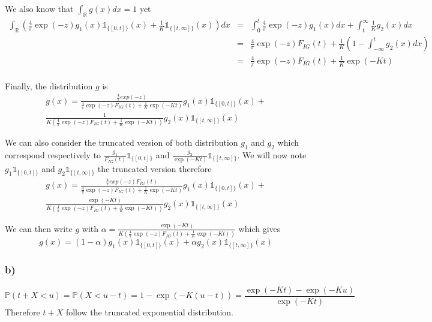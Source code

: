We also know that $\int_{\mathbb{R}} g(x)dx = 1$ yet
\begin{eqnarray*}
	\int_{\mathbb{R}}\left(\frac{4}{\pi}\exp(-z) g_1(x) \mathbb{1}_{\{[0,t]\}}(x)+ \frac{1}{K}\mathbb{1}_{\{[t,\infty]\}}(x)\right)dx &=& \int_{0}^t \frac{4}{\pi}\exp(-z) g_1(x)dx + \int_t^\infty \frac{1}{K}g_2(x)dx\\
	&=& \frac{4}{\pi} \exp(-z) F_{IG}(t) + \frac{1}{K} (1 - \int_{-\infty}^t g_2(x)dx)\\
	&=& \frac{4}{\pi} \exp(-z) F_{IG}(t) + \frac{1}{K} \exp(-Kt)\\
\end{eqnarray*}

Finally, the distribution $g$ is 
\begin{eqnarray*}
	g(x) = \frac{\frac{4}{\pi}exp(-z)}{\frac{4}{\pi} \exp(-z) F_{IG}(t) + \frac{1}{K} \exp(-Kt)}g_1(x) \mathbb{1}_{\{[0,t]\}}(x)+\\ \frac{1}{K(\frac{4}{\pi} \exp(-z) F_{IG}(t) + \frac{1}{K} \exp(-Kt))} g_2(x) \mathbb{1}_{\{[t,\infty]\}}(x)
\end{eqnarray*}


We can also consider the truncated version of both distribution $g_1$ and $g_2$ which correspond respectively to $\frac{g_1}{F_{IG}(t)}\mathbb{1}_{\{[0,t]\}}$ and $\frac{g_2}{\exp(-Kt)}\mathbb{1}_{\{[t,\infty]\}}$. We will now note $g_1\mathbb{1}_{\{[0,t]\}}$ and $g_2\mathbb{1}_{\{[t,\infty]\}}$ the truncated version therefore
\begin{eqnarray*}
	g(x) = \frac{\frac{4}{\pi}exp(-z)F_{IG}(t)}{\frac{4}{\pi} \exp(-z) F_{IG}(t) + \frac{1}{K} \exp(-Kt)}g_1(x) \mathbb{1}_{\{[0,t]\}}(x)+\\ \frac{\exp(-Kt)}{K(\frac{4}{\pi} \exp(-z) F_{IG}(t) + \frac{1}{K} \exp(-Kt))} g_2(x) \mathbb{1}_{\{[t,\infty]\}}(x)
\end{eqnarray*}


We can then write $g$ with $\alpha = \frac{\exp(-Kt)}{K(\frac{4}{\pi} \exp(-z) F_{IG}(t) + \frac{1}{K} \exp(-Kt))}$ which gives
\[g(x) = (1-\alpha) g_1(x)  \mathbb{1}_{\{[0,t]\}}(x) + \alpha g_2(x)  \mathbb{1}_{\{[t,\infty]\}}(x)\]

\subsubsection*{b)}

\[\mathbb{P}(t + X < u) = \mathbb{P}(X < u-t) = 1 - \exp(-K(u-t)) = \frac{\exp(-Kt) - \exp(-Ku)}{\exp(-Kt)}\]
Therefore $t + X$ follow the truncated exponential distribution.


